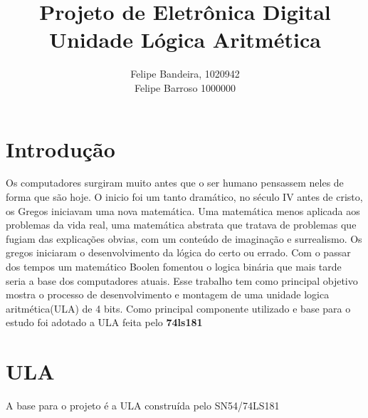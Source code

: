 \documentclass[a4paper, 11pt]{article}
\title{Projeto de Eletrônica Digital\\Unidade Lógica Aritmética}
\author{Felipe Bandeira, 1020942\\Felipe Barroso 1000000}
\begin{document}
\maketitle

%
%



\newpage

\section{Introdução}

Os computadores surgiram muito antes que o ser humano pensassem neles 
de forma que são hoje. O inicio foi um tanto dramático, no século IV 
antes de cristo, os Gregos iniciavam uma nova matemática. Uma matemática
menos aplicada aos problemas da vida real, uma matemática abstrata que
tratava de problemas que fugiam das explicações obvias, com um conteúdo
de imaginação e surrealismo. Os gregos iniciaram o desenvolvimento da
lógica do certo ou errado. Com o passar dos tempos um matemático
Boolen fomentou o logica binária que mais tarde seria a base dos computadores
atuais. Esse trabalho tem como principal objetivo mostra o processo de 
desenvolvimento e montagem de uma unidade logica aritmética(ULA) de 4 bits. 
Como principal componente utilizado e base para o estudo foi adotado
a ULA feita pelo \textbf{74ls181}

% 
\newpage

\section{ULA}

A base para o projeto é a ULA construída pelo SN54/74LS181
\end{document}
